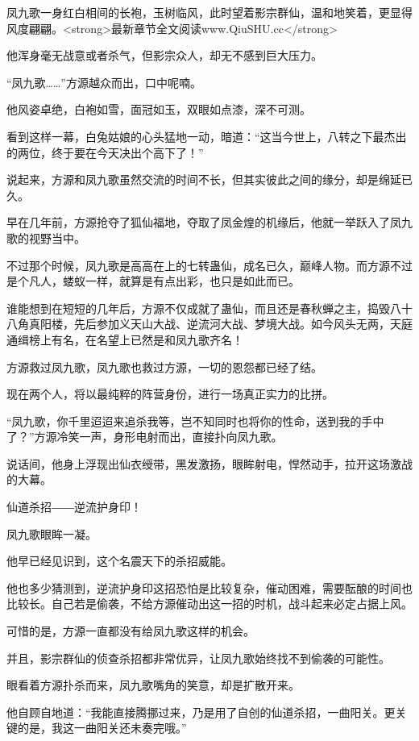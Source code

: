 
\begin{this_body}

凤九歌一身红白相间的长袍，玉树临风，此时望着影宗群仙，温和地笑着，更显得风度翩翩。<strong>最新章节全文阅读www.QiuSHU.cc</strong>

他浑身毫无战意或者杀气，但影宗众人，却无不感到巨大压力。

“凤九歌……”方源越众而出，口中呢喃。

他风姿卓绝，白袍如雪，面冠如玉，双眼如点漆，深不可测。

看到这样一幕，白兔姑娘的心头猛地一动，暗道：“这当今世上，八转之下最杰出的两位，终于要在今天决出个高下了！”

说起来，方源和凤九歌虽然交流的时间不长，但其实彼此之间的缘分，却是绵延已久。

早在几年前，方源抢夺了狐仙福地，夺取了凤金煌的机缘后，他就一举跃入了凤九歌的视野当中。

不过那个时候，凤九歌是高高在上的七转蛊仙，成名已久，巅峰人物。而方源不过是个凡人，蝼蚁一样，就算是有点出彩，也只是如此而已。

谁能想到在短短的几年后，方源不仅成就了蛊仙，而且还是春秋蝉之主，捣毁八十八角真阳楼，先后参加义天山大战、逆流河大战、梦境大战。如今风头无两，天庭通缉榜上有名，在名望上已然是和凤九歌齐名！

方源救过凤九歌，凤九歌也救过方源，一切的恩怨都已经了结。

现在两个人，将以最纯粹的阵营身份，进行一场真正实力的比拼。

“凤九歌，你千里迢迢来追杀我等，岂不知同时也将你的性命，送到我的手中了？”方源冷笑一声，身形电射而出，直接扑向凤九歌。

说话间，他身上浮现出仙衣绶带，黑发激扬，眼眸射电，悍然动手，拉开这场激战的大幕。

仙道杀招――逆流护身印！

凤九歌眼眸一凝。

他早已经见识到，这个名震天下的杀招威能。

他也多少猜测到，逆流护身印这招恐怕是比较复杂，催动困难，需要酝酿的时间也比较长。自己若是偷袭，不给方源催动出这一招的时机，战斗起来必定占据上风。

可惜的是，方源一直都没有给凤九歌这样的机会。

并且，影宗群仙的侦查杀招都非常优异，让凤九歌始终找不到偷袭的可能性。

眼看着方源扑杀而来，凤九歌嘴角的笑意，却是扩散开来。

他自顾自地道：“我能直接腾挪过来，乃是用了自创的仙道杀招，一曲阳关。更关键的是，我这一曲阳关还未奏完哦。”


\end{this_body}
